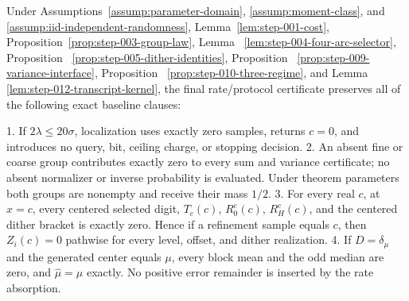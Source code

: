 \begin{proposition}\label{prop:step-014-baseline}
Under Assumptions~\ref{assump:parameter-domain},
\ref{assump:moment-class}, and
\ref{assump:iid-independent-randomness}, Lemma~\ref{lem:step-001-cost},
Proposition~\ref{prop:step-003-group-law}, Lemma~
\ref{lem:step-004-four-arc-selector}, Proposition~
\ref{prop:step-005-dither-identities}, Proposition~
\ref{prop:step-009-variance-interface}, Proposition~
\ref{prop:step-010-three-regime}, and Lemma~
\ref{lem:step-012-transcript-kernel}, the final
rate/protocol certificate preserves all of the following exact baseline
clauses:

1. If \(2\lambda\leq20\sigma\), localization uses exactly zero samples,
   returns \(c=0\), and introduces no query, bit, ceiling charge, or stopping
   decision.
2. An absent fine or coarse group contributes exactly zero to every sum and
   variance certificate; no absent normalizer or inverse probability is
   evaluated. Under theorem parameters both groups are nonempty and receive
   their mass \(1/2\).
3. For every real \(c\), at \(x=c\), every centered selected digit,
   \(T_c(c)\), \(R_0^c(c)\), \(R_H^c(c)\), and the centered dither bracket is
   exactly zero. Hence if a refinement sample equals \(c\), then
   \(Z_i(c)=0\) pathwise for every level, offset, and dither realization.
4. If \(D=\delta_\mu\) and the generated center equals \(\mu\), every block
   mean and the odd median are zero, and \(\widehat\mu=\mu\) exactly. No
   positive error remainder is inserted by the rate absorption.
\end{proposition}

